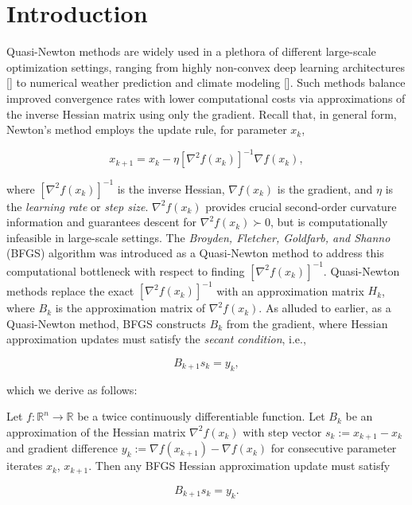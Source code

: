 \documentclass[twoside,11pt]{article}
\begin{document}
\section{Introduction}

Quasi-Newton methods are widely used in a plethora of different large-scale optimization settings, ranging from highly non-convex deep learning architectures [\cite{RM19}] to numerical weather prediction and climate modeling [\cite{DN03}]. Such methods balance improved convergence rates with lower computational costs via approximations of the inverse Hessian matrix using only the gradient. Recall that, in general form, Newton's method employs the update rule, for parameter $x_k$,

\begin{equation}
x_{k+1} = x_k - \eta[\nabla^2f(x_k)]^{-1} \nabla f(x_k),
\end{equation}

\noindent
where $[\nabla^2f(x_k)]^{-1}$ is the inverse Hessian, $\nabla f(x_k)$ is the gradient, and $\eta$ is the \textit{learning rate} or \textit{step size}. $\nabla^2f(x_k)$ provides crucial second-order curvature information and guarantees descent for $\nabla^2f(x_k) \succ 0$, but is computationally infeasible in large-scale settings. The \textit{Broyden, Fletcher, Goldfarb, and Shanno} (BFGS) algorithm was introduced as a Quasi-Newton method to address this computational bottleneck with respect to finding $[\nabla^2f(x_k)]^{-1}$. Quasi-Newton methods replace the exact $[\nabla^2f(x_k)]^{-1}$ with an approximation matrix $H_k$, where $B_k$ is the approximation matrix of $\nabla^2f(x_k)$. As alluded to earlier, as a Quasi-Newton method, BFGS constructs $B_k$ from the gradient, where Hessian approximation updates must satisfy the \textit{secant condition}, i.e.,

\begin{equation}
B_{k+1}s_k = y_k,
\end{equation}

\noindent
which we derive as follows:

\begin{theorem}
Let $f: \mathbb{R}^n \rightarrow \mathbb{R}$ be a twice continuously differentiable function. Let $B_k$ be an approximation of the Hessian matrix $\nabla^2f(x_k)$ with step vector $s_k := x_{k+1}-x_k$ and gradient difference $y_k := \nabla f(x_{k+1}) - \nabla f(x_k)$ for consecutive parameter iterates $x_k$, $x_{k+1}$. Then any BFGS Hessian approximation update must satisfy

\[
B_{k+1}s_k = y_k.
\]
\end{theorem}
\end{document}
